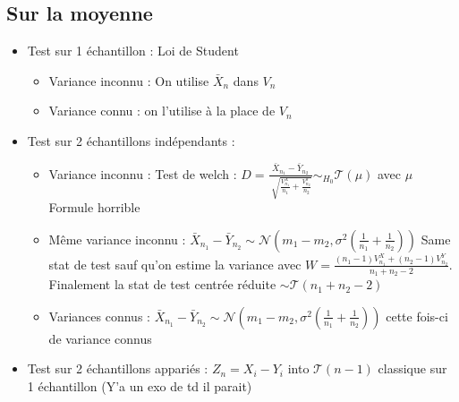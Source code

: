 \documentclass{article}
\theoremstyle{plain}%
\theoremstyle{definition}
\theoremstyle{remark}
\begin{document}
\subsection{Sur la moyenne}
\begin{itemize}
    \item Test sur 1 échantillon : Loi de Student \begin{itemize}
        \item Variance inconnu : On utilise $ \bar{X}_n $ dans $ V_n $ 
        \item Variance connu : on l'utilise à la place de $ V_n $ 
    \end{itemize}
    
    \item Test sur 2 échantillons indépendants : \begin{itemize}
        \item Variance inconnu : Test de welch : $ D = \frac{\bar{X}_{n_1} - \bar{Y}_{n_2}}{\sqrt[]{\frac{V_{n_1}^X}{n_1} + \frac{V_{n_2}^Y}{n_2}}} \sim_{H_0} \mathcal{T}(\mu ) $ avec $ \mu $ Formule horrible  
        \item Même variance inconnu : $ \bar{X}_{n_1} - \bar{Y}_{n_2} \sim \mathcal{N}(m_1 - m_2, \sigma ^2 (\frac{1}{n_1} + \frac{1}{n_2}))$ Same stat de test sauf qu'on estime la variance avec $ W = \frac{(n_1 - 1) V_{n_1}^X + (n_2 - 1) V_{n_2}^Y}{n_1 + n_2 - 2}$. Finalement la stat de test centrée réduite $ \sim \mathcal{T}(n_1 + n_2 - 2) $ 
        \item Variances connus :  $ \bar{X}_{n_1} - \bar{Y}_{n_2} \sim \mathcal{N}(m_1 - m_2, \sigma ^2 (\frac{1}{n_1} + \frac{1}{n_2}))$ cette fois-ci de variance connus
    \end{itemize}

    \item Test sur 2 échantillons appariés : $ Z_n = X_i - Y_i $ into $ \mathcal{T}(n-1) $ classique sur 1 échantillon  (Y'a un exo de td il parait)
\end{itemize}
\end{document}
